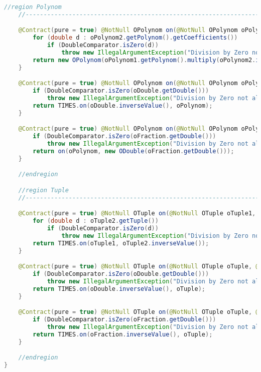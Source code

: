 \begin{lstlisting}[caption=Slash (Falk),label=list:Slash,language=Java]
    //region Polynom
    //------------------------------------------------------------------------------------

    @Contract(pure = true) @NotNull OPolynom on(@NotNull OPolynom oPolynom1, @NotNull OPolynom oPolynom2) {
        for (double d : oPolynom2.getPolynom().getCoefficients())
            if (DoubleComparator.isZero(d))
                throw new IllegalArgumentException("Division by Zero not allowed");
        return new OPolynom(oPolynom1.getPolynom().multiply(oPolynom2.inverseValue().getPolynom()));
    }

    @Contract(pure = true) @NotNull OPolynom on(@NotNull OPolynom oPolynom, @NotNull ODouble oDouble) {
        if (DoubleComparator.isZero(oDouble.getDouble()))
            throw new IllegalArgumentException("Division by Zero not allowed");
        return TIMES.on(oDouble.inverseValue(), oPolynom);
    }

    @Contract(pure = true) @NotNull OPolynom on(@NotNull OPolynom oPolynom, @NotNull OFraction oFraction) {
        if (DoubleComparator.isZero(oFraction.getDouble()))
            throw new IllegalArgumentException("Division by Zero not allowed");
        return on(oPolynom, new ODouble(oFraction.getDouble()));
    }

    //endregion

    //region Tuple
    //------------------------------------------------------------------------------------

    @Contract(pure = true) @NotNull OTuple on(@NotNull OTuple oTuple1, @NotNull OTuple oTuple2) {
        for (double d : oTuple2.getTuple())
            if (DoubleComparator.isZero(d))
                throw new IllegalArgumentException("Division by Zero not allowed");
        return TIMES.on(oTuple1, oTuple2.inverseValue());
    }

    @Contract(pure = true) @NotNull OTuple on(@NotNull OTuple oTuple, @NotNull ODouble oDouble) {
        if (DoubleComparator.isZero(oDouble.getDouble()))
            throw new IllegalArgumentException("Division by Zero not allowed");
        return TIMES.on(oDouble.inverseValue(), oTuple);
    }

    @Contract(pure = true) @NotNull OTuple on(@NotNull OTuple oTuple, @NotNull OFraction oFraction) {
        if (DoubleComparator.isZero(oFraction.getDouble()))
            throw new IllegalArgumentException("Division by Zero not allowed");
        return TIMES.on(oFraction.inverseValue(), oTuple);
    }

    //endregion
}
\end{lstlisting}    

